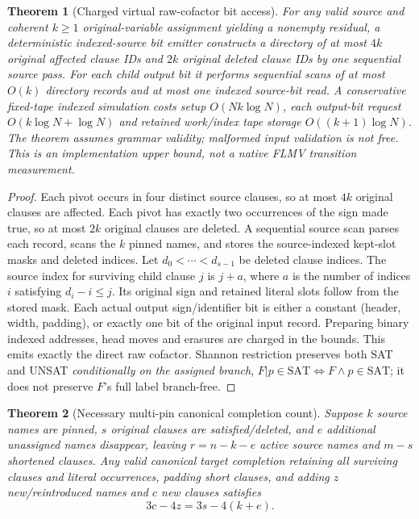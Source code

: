 \documentclass[10pt]{article}
\newtheorem{theorem}{Theorem}
\begin{document}
\begin{theorem}[Charged virtual raw-cofactor bit access]
For any valid source and coherent $k\ge1$ original-variable assignment yielding a nonempty residual, a deterministic indexed-source bit emitter constructs a directory of at most $4k$ original affected clause IDs and $2k$ original deleted clause IDs by one sequential source pass. For each child output bit it performs sequential scans of at most $O(k)$ directory records and at most one indexed source-bit read. A conservative fixed-tape indexed simulation costs setup $O(Nk\log N)$, each output-bit request $O(k\log N+\log N)$ and retained work/index tape storage $O((k+1)\log N)$. The theorem assumes grammar validity; malformed input validation is not free. This is an implementation upper bound, not a native FLMV transition measurement.
\end{theorem}
\begin{proof}
Each pivot occurs in four distinct source clauses, so at most $4k$ original clauses are affected. Each pivot has exactly two occurrences of the sign made true, so at most $2k$ original clauses are deleted. A sequential source scan parses each record, scans the $k$ pinned names, and stores the source-indexed kept-slot masks and deleted indices. Let $d_0<\cdots<d_{s-1}$ be deleted clause indices. The source index for surviving child clause $j$ is $j+a$, where $a$ is the number of indices $i$ satisfying $d_i-i\le j$. Its original sign and retained literal slots follow from the stored mask. Each actual output sign/identifier bit is either a constant (header, width, padding), or exactly one bit of the original input record. Preparing binary indexed addresses, head moves and erasures are charged in the bounds. This emits exactly the direct raw cofactor. Shannon restriction preserves both SAT and UNSAT \emph{conditionally on the assigned branch}, $F|p\in\mathrm{SAT}\iff F\land p\in\mathrm{SAT}$; it does not preserve $F$'s full label branch-free.
\end{proof}
\begin{theorem}[Necessary multi-pin canonical completion count]
Suppose $k$ source names are pinned, $s$ original clauses are satisfied/deleted, and $e$ additional unassigned names disappear, leaving $r=n-k-e$ active source names and $m-s$ shortened clauses. Any valid canonical target \emph{completion} retaining all surviving clauses and literal occurrences, padding short clauses, and adding $z$ new/reintroduced names and $c$ new clauses satisfies
\[
\boxed{3c-4z=3s-4(k+e)}.
\]
\end{theorem}
\end{document}
